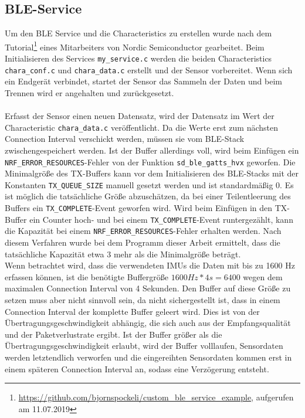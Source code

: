 \subsection{BLE-Service}
Um den BLE Service und die Characteristics zu erstellen wurde nach dem Tutorial\footnote{\url{https://github.com/bjornspockeli/custom\_ble\_service\_example}, aufgerufen am 11.07.2019} eines Mitarbeiters von Nordic Semiconductor gearbeitet.
Beim Initialisieren des Services \texttt{my\_service.c} werden die beiden Characteristics \texttt{chara\_conf.c} und \texttt{chara\_data.c} erstellt und der Sensor vorbereitet.
Wenn sich ein Endgerät verbindet, startet der Sensor das Sammeln der Daten und beim Trennen wird er angehalten und zurückgesetzt.\\\\
Erfasst der Sensor einen neuen Datensatz, wird der Datensatz im Wert der Characteristic \texttt{chara\_data.c} veröffentlicht.
Da die Werte erst zum nächsten Connection Interval verschickt werden, müssen sie vom BLE-Stack zwischengespeichert werden.
Ist der Buffer allerdings voll, wird beim Einfügen ein \texttt{NRF\_ERROR\_RESOURCES}-Fehler von der Funktion \texttt{sd\_ble\_gatts\_hvx} geworfen.
Die Minimalgröße des TX-Buffers kann vor dem Initialisieren des BLE-Stacks mit der Konstanten \texttt{TX\_QUEUE\_SIZE} manuell gesetzt werden und ist standardmäßig 0.
Es ist möglich die tatsächliche Größe abzuschätzen, da bei einer Teilentleerung des Buffers ein \texttt{TX\_COMPLETE}-Event geworfen wird.
Wird beim Einfügen in den TX-Buffer ein Counter hoch- und bei einem \texttt{TX\_COMPLETE}-Event runtergezählt, kann die Kapazität bei einem \texttt{NRF\_ERROR\_RESOURCES}-Fehler erhalten werden.
Nach diesem Verfahren wurde bei dem Programm dieser Arbeit ermittelt, dass die tatsächliche Kapazität etwa 3 mehr als die Minimalgröße beträgt.\\
Wenn betrachtet wird, dass die verwendeten IMUs die Daten mit bis zu 1600 Hz erfassen können, ist die benötigte Buffergröße $1600 Hz * 4s = 6400$ wegen dem maximalen Connection Interval von 4 Sekunden.
Den Buffer auf diese Größe zu setzen muss aber nicht sinnvoll sein, da nicht sichergestellt ist, dass in einem Connection Interval der komplette Buffer geleert wird.
Dies ist von der Übertragungsgeschwindigkeit abhängig, die sich auch aus der Empfangsqualität und der Paketverlustrate ergibt.
Ist der Buffer größer als die Übertragungsgeschwindigkeit erlaubt, wird der Buffer volllaufen, Sensordaten werden letztendlich verworfen und die eingereihten Sensordaten kommen erst in einem späteren Connection Interval an, sodass eine Verzögerung entsteht.
